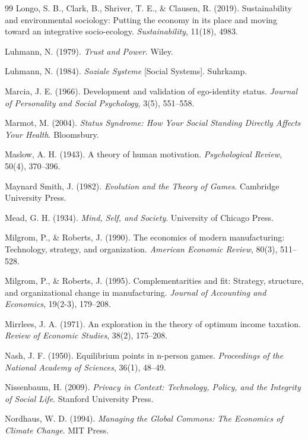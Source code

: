 \begin{thebibliography}{99}
Longo, S. B., Clark, B., Shriver, T. E., \& Clausen, R. (2019).
Sustainability and environmental sociology: Putting the economy in its place and moving toward an integrative socio-ecology.
\textit{Sustainability}, 11(18), 4983.

Luhmann, N. (1979).
\textit{Trust and Power}.
Wiley.

Luhmann, N. (1984).
\textit{Soziale Systeme} [Social Systems].
Suhrkamp.

Marcia, J. E. (1966).
Development and validation of ego-identity status.
\textit{Journal of Personality and Social Psychology}, 3(5), 551--558.

Marmot, M. (2004).
\textit{Status Syndrome: How Your Social Standing Directly Affects Your Health}.
Bloomsbury.

Maslow, A. H. (1943).
A theory of human motivation.
\textit{Psychological Review}, 50(4), 370--396.

Maynard Smith, J. (1982).
\textit{Evolution and the Theory of Games}.
Cambridge University Press.

Mead, G. H. (1934).
\textit{Mind, Self, and Society}.
University of Chicago Press.

Milgrom, P., \& Roberts, J. (1990).
The economics of modern manufacturing: Technology, strategy, and organization.
\textit{American Economic Review}, 80(3), 511--528.

Milgrom, P., \& Roberts, J. (1995).
Complementarities and fit: Strategy, structure, and organizational change in manufacturing.
\textit{Journal of Accounting and Economics}, 19(2-3), 179--208.

Mirrlees, J. A. (1971).
An exploration in the theory of optimum income taxation.
\textit{Review of Economic Studies}, 38(2), 175--208.

Nash, J. F. (1950).
Equilibrium points in n-person games.
\textit{Proceedings of the National Academy of Sciences}, 36(1), 48--49.

Nissenbaum, H. (2009).
\textit{Privacy in Context: Technology, Policy, and the Integrity of Social Life}.
Stanford University Press.

Nordhaus, W. D. (1994).
\textit{Managing the Global Commons: The Economics of Climate Change}.
MIT Press.


\end{thebibliography}
